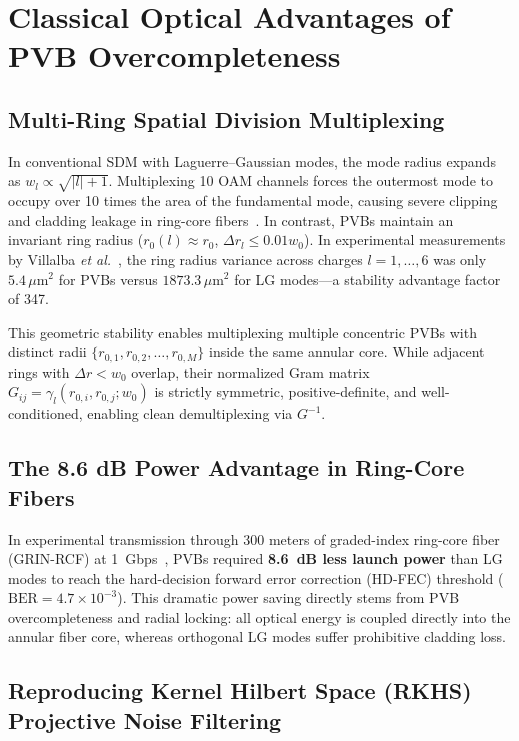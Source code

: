 \documentclass[11pt,a4paper]{article}
\begin{document}
\section{Classical Optical Advantages of PVB Overcompleteness}
\label{sec:classical_advantages}

\subsection{Multi-Ring Spatial Division Multiplexing}

In conventional SDM with Laguerre--Gaussian modes, the mode radius expands as $w_l \propto \sqrt{|l| + 1}$. Multiplexing 10 OAM channels forces the outermost mode to occupy over 10 times the area of the fundamental mode, causing severe clipping and cladding leakage in ring-core fibers~\cite{Villalba2023}. In contrast, PVBs maintain an invariant ring radius ($r_0(l) \approx r_0$, $\Delta r_l \le 0.01 w_0$). In experimental measurements by Villalba \emph{et al.}~\cite{Villalba2023}, the ring radius variance across charges $l = 1, \dots, 6$ was only $5.4\,\mu\text{m}^2$ for PVBs versus $1873.3\,\mu\text{m}^2$ for LG modes---a stability advantage factor of 347.

This geometric stability enables multiplexing multiple concentric PVBs with distinct radii $\{r_{0, 1}, r_{0, 2}, \dots, r_{0, M}\}$ inside the same annular core. While adjacent rings with $\Delta r < w_0$ overlap, their normalized Gram matrix $G_{ij} = \gamma_l(r_{0, i}, r_{0, j}; w_0)$ is strictly symmetric, positive-definite, and well-conditioned, enabling clean demultiplexing via $G^{-1}$.

\subsection{The 8.6 dB Power Advantage in Ring-Core Fibers}

In experimental transmission through 300 meters of graded-index ring-core fiber (GRIN-RCF) at 1~Gbps~\cite{Villalba2023}, PVBs required \textbf{8.6~dB less launch power} than LG modes to reach the hard-decision forward error correction (HD-FEC) threshold ($\text{BER} = 4.7 \times 10^{-3}$). This dramatic power saving directly stems from PVB overcompleteness and radial locking: all optical energy is coupled directly into the annular fiber core, whereas orthogonal LG modes suffer prohibitive cladding loss.

\subsection{Reproducing Kernel Hilbert Space (RKHS) Projective Noise Filtering}
\end{document}
